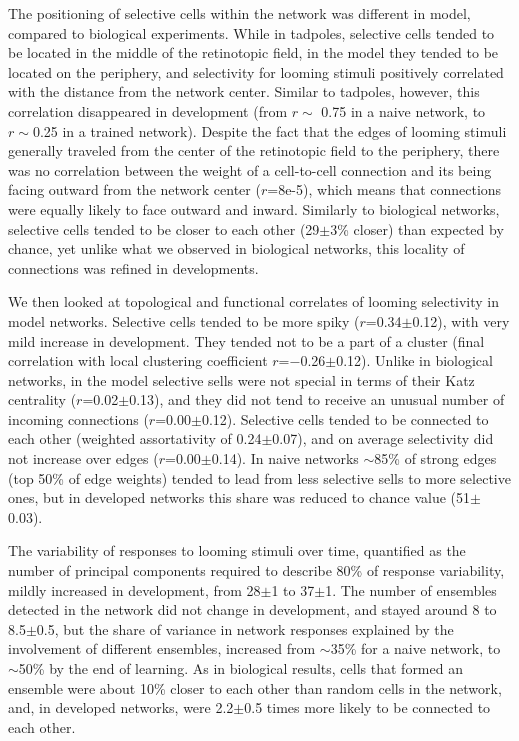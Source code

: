 \documentclass{article}
\begin{document}
The positioning of selective cells within the network was different in model, compared to biological experiments. While in tadpoles, selective cells tended to be located in the middle of the retinotopic field, in the model they tended to be located on the periphery, and selectivity for looming stimuli positively correlated with the distance from the network center. Similar to tadpoles, however, this correlation disappeared in development (from $r\sim$ 0.75 in a naive network, to $r\sim$0.25 in a trained network). Despite the fact that the edges of looming stimuli generally traveled from the center of the retinotopic field to the periphery, there was no correlation between the weight of a cell-to-cell connection and its being facing outward from the network center ($r$=8e-5), which means that connections were equally likely to face outward and inward. Similarly to biological networks, selective cells tended to be closer to each other (29$\pm$3\% closer) than expected by chance, yet unlike what we observed in biological networks, this locality of connections was refined in developments.

We then looked at topological and functional correlates of looming selectivity in model networks. Selective cells tended to be more spiky ($r$=0.34$\pm$0.12), with very mild increase in development. They tended not to be a part of a cluster (final correlation with local clustering coefficient $r$=$-$0.26$\pm$0.12). Unlike in biological networks, in the model selective sells were not special in terms of their Katz centrality ($r$=0.02$\pm$0.13), and they did not tend to receive an unusual number of incoming connections ($r$=0.00$\pm$0.12). Selective cells tended to be connected to each other (weighted assortativity of 0.24$\pm$0.07), and on average selectivity did not increase over edges ($r$=0.00$\pm$0.14). In naive networks $\sim$85\% of strong edges (top 50\% of edge weights) tended to lead from less selective sells to more selective ones, but in developed networks this share was reduced to chance value (51$±$0.03).

The variability of responses to looming stimuli over time, quantified as the number of principal components required to describe 80\% of response variability, mildly increased in development, from 28$\pm$1 to 37$\pm$1. The number of ensembles detected in the network did not change in development, and stayed around 8 to 8.5$\pm$0.5, but the share of variance in network responses explained by the involvement of different ensembles, increased from $\sim$35\% for a naive network, to $\sim$50\% by the end of learning. As in biological results, cells that formed an ensemble were about 10\% closer to each other than random cells in the network, and, in developed networks, were 2.2$\pm$0.5 times more likely to be connected to each other.
\end{document}
